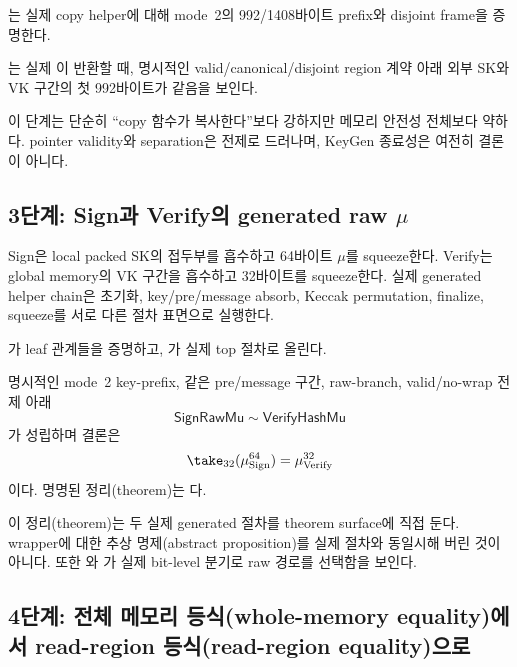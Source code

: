 는 실제 copy helper에 대해 mode~2의
992/1408바이트 prefix와 disjoint frame을 증명한다.

\begin{verified}
는 실제
이 반환할 때, 명시적인
valid/canonical/disjoint region 계약 아래 외부 SK와 VK 구간의 첫 992바이트가
같음을 보인다.
\end{verified}

이 단계는 단순히 ``copy 함수가 복사한다''보다 강하지만 메모리 안전성 전체보다
약하다. pointer validity와 separation은 전제로 드러나며, KeyGen 종료성은
여전히 결론이 아니다.

\subsection{3단계: Sign과 Verify의 generated raw \texorpdfstring{\(\mu\)}{mu}}

Sign은 local packed SK의 접두부를 흡수하고 64바이트 \(\mu\)를 squeeze한다.
Verify는 global memory의 VK 구간을 흡수하고 32바이트를 squeeze한다. 실제
generated helper chain은 초기화, key/pre/message absorb, Keccak permutation,
finalize, squeeze를 서로 다른 절차 표면으로 실행한다.

가 leaf 관계들을 증명하고,
가 실제 top 절차로 올린다.

\begin{verified}
명시적인 mode~2 key-prefix, 같은 pre/message 구간, raw-branch, valid/no-wrap
전제 아래
\[
  \mathsf{SignRawMu}\sim\mathsf{VerifyHashMu}
\]
가 성립하며 결론은
\[
  \take_{32}(\mu^{64}_{\mathrm{Sign}})
  =\mu^{32}_{\mathrm{Verify}}
\]
이다. 명명된 정리(theorem)는
다.
\end{verified}

이 정리(theorem)는 두 실제 generated 절차를 theorem surface에 직접 둔다.
wrapper에 대한 추상 명제(abstract proposition)를 실제 절차와 동일시해 버린
것이 아니다. 또한
와
가 실제 bit-level 분기로 raw 경로를
선택함을 보인다.

\subsection{4단계: 전체 메모리 등식(whole-memory equality)에서
read-region 등식(read-region equality)으로}

